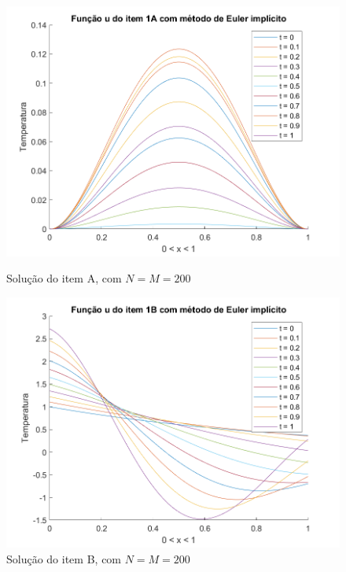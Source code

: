 \documentclass[12pt]{article}
\begin{document}
\begin{spacing}{1.5}
\begin{figure}[ht!]
\centering
    \begin{minipage}[b]{0.45\linewidth}
    \includegraphics[width=1\linewidth]{Segunda_Tarefa/ItemB/itemA_2D.png}
    \caption{Solução do item A, com $N=M=200$}
    \label{fig:Tarefa2B_itemA_2D}
\end{minipage}
\quad
\begin{minipage}[b]{0.45\linewidth}
    \includegraphics[width=1\linewidth]{Segunda_Tarefa/ItemB/itemB_2D.png}
    \caption{Solução do item B, com $N=M=200$}
    \label{fig:Tarefa2B_itemB_2D}
\end{minipage}
\end{figure} 


\end{spacing}
\end{document}
